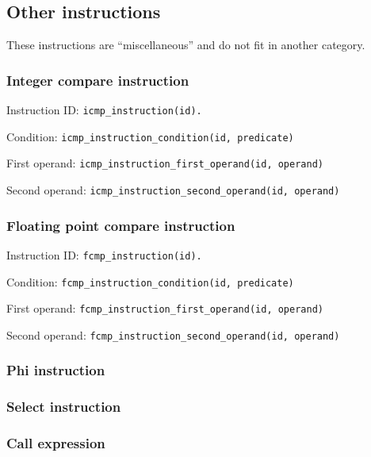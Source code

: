 \subsection{Other instructions}
These instructions are ``miscellaneous'' and do not fit in another category.


\subsubsection{Integer compare instruction}
Instruction ID:
\texttt{icmp\_instruction(id).}

\noindent Condition:
\texttt{icmp\_instruction\_condition(id, predicate)}

\noindent First operand:
\texttt{icmp\_instruction\_first\_operand(id, operand)}

\noindent Second operand:
\texttt{icmp\_instruction\_second\_operand(id, operand)}


\subsubsection{Floating point compare instruction}
Instruction ID:
\texttt{fcmp\_instruction(id).}

\noindent Condition:
\texttt{fcmp\_instruction\_condition(id, predicate)}

\noindent First operand:
\texttt{fcmp\_instruction\_first\_operand(id, operand)}

\noindent Second operand:
\texttt{fcmp\_instruction\_second\_operand(id, operand)}


\subsubsection{Phi instruction}


\subsubsection{Select instruction}


\subsubsection{Call expression}

